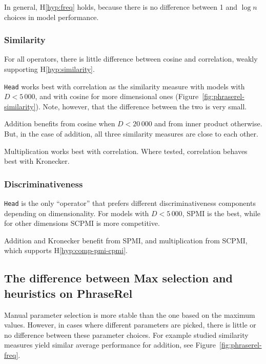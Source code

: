 In general, H\ref{hyp:freq} holds, because there is no difference between 1 and $\log n$ choices in model performance.



\subsubsection{Similarity}
\label{sec:similarity-phraserel}

For all operators, there is little difference between cosine and correlation, weakly supporting H\ref{hyp:similarity}.

\texttt{Head} works best with correlation as the similarity measure with models with $D < 5\,000$, and with cosine for more dimensional ones (Figure~\ref{fig:phraserel-similarity}). Note, however, that the difference between the two is very small.

Addition benefits from cosine when $D < 20\,000$ and from inner product otherwise. But, in the case of addition, all three similarity measures are close to each other.

Multiplication works best with correlation. Where tested, correlation behaves best with Kronecker.

\subsubsection{Discriminativeness}
\label{sec:discriminativeness-phraserel}



\texttt{Head} is the only ``operator'' that prefers  different discriminativeness components depending on dimensionality. For models with $D < 5\,000$, SPMI is the best, while for other dimensions SCPMI is more competitive.

Addition and Kronecker benefit from SPMI, and multiplication from SCPMI, which supports H\ref{hyp:comp-pmi-cpmi}.

\subsection{The difference between Max selection and heuristics on PhraseRel}
\label{sec:diff-phraserel}

Manual parameter selection is more stable than the one based on the maximum values. However, in cases where different parameters are picked, there is little or no difference between these parameter choices. For example studied similarity measures yield similar average performance for addition, see Figure~\ref{fig:phraserel-freq}.

